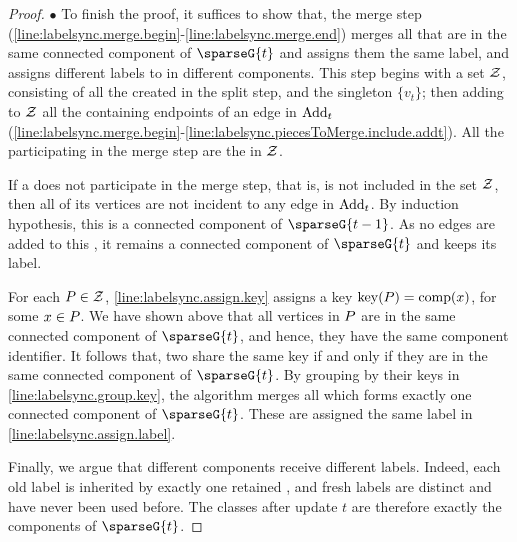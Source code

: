\begin{proof}
    $ \bullet $ To finish the proof, it suffices to show that, the merge step (\cref{line:labelsync.merge.begin}-\cref{line:labelsync.merge.end}) merges all  that are in the same connected component of $ \sparseG{t} $ and assigns them the same label, and assigns different labels to  in different components. 
    This step begins with a set $ \mathcal{Z} $, consisting of all the  created in the split step, and the singleton $ \{v_t\} $; then adding to $ \mathcal{Z} $ all the  containing endpoints of an edge in $ \mathrm{Add}_{t} $ (\cref{line:labelsync.merge.begin}-\cref{line:labelsync.piecesToMerge.include.addt}).
    All the  participating in the merge step are the  in $ \mathcal{Z} $.

    If a \piece{} does not participate in the merge step, that is, is not included in the set $ \mathcal{Z} $, then all of its vertices are not incident to any edge in $ \mathrm{Add}_{t} $.
    By induction hypothesis, this \piece{} is a connected component of $ \sparseG{t-1} $.
    As no edges are added to this \piece{}, it remains a connected component of $ \sparseG{t} $ and keeps its label.

    For each \piece{} $ P \in \mathcal{Z} $, \cref{line:labelsync.assign.key} assigns a key $ \mathrm{key}(P) = \mathrm{comp}(x) $, for some $ x \in P $.
    We have shown above that all vertices in $ P $ are in the same connected component of $ \sparseG{t} $, and hence, they have the same component identifier.
    It follows that, two  share the same key if and only if they are in the same connected component of $ \sparseG{t} $.
    By grouping  by their keys in \cref{line:labelsync.group.key}, the algorithm merges all  which forms exactly one connected component of $ \sparseG{t} $.
    These  are assigned the same label in \cref{line:labelsync.assign.label}.

    Finally, we argue that different components receive different labels. Indeed, each old label is inherited by exactly one retained \piece{}, and fresh labels are distinct and have never been used before.
    The classes after update $ t $ are therefore exactly the components of $ \sparseG{t} $.
\end{proof}

